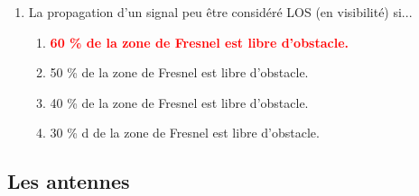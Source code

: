 \documentclass[a4paper]{article}
\begin{document}
\begin{enumerate}[label=Q\arabic*.]
\item La propagation d'un signal peu être considéré LOS (en visibilité) si...
\begin{enumerate}
    \item \textcolor{red}{\textbf{60 \% de la zone de Fresnel est libre d'obstacle.}}
    \item 50 \% de la zone de Fresnel est libre d'obstacle.
    \item 40 \% de la zone de Fresnel est libre d'obstacle.
    \item 30 \% d de la zone de Fresnel est libre d'obstacle.
\end{enumerate}


\end{enumerate}










\subsection{Les antennes}
\end{document}
